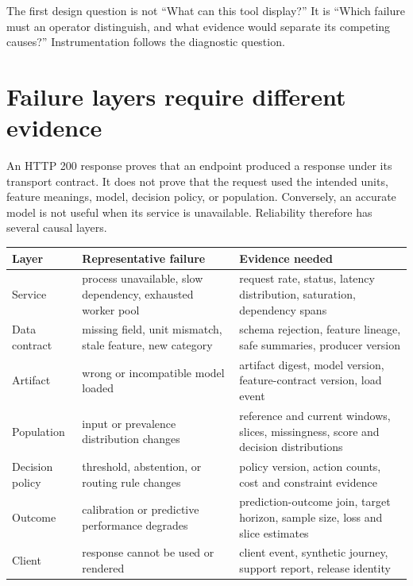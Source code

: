 The first design question is not ``What can this tool display?'' It is ``Which
failure must an operator distinguish, and what evidence would separate its
competing causes?'' Instrumentation follows the diagnostic question.

\section{Failure layers require different evidence}

An HTTP 200 response proves that an endpoint produced a response under its
transport contract. It does not prove that the request used the intended units,
feature meanings, model, decision policy, or population. Conversely, an
accurate model is not useful when its service is unavailable. Reliability
therefore has several causal layers.

\small
\begin{longtable}{@{}>{\raggedright\arraybackslash}p{}>{\raggedright\arraybackslash}p{}>{\raggedright\arraybackslash}p{}@{}}
\toprule
\textbf{Layer} & \textbf{Representative failure} & \textbf{Evidence needed} \\
\midrule
\endhead
Service & process unavailable, slow dependency, exhausted worker pool & request
rate, status, latency distribution, saturation, dependency spans \\
Data contract & missing field, unit mismatch, stale feature, new category &
schema rejection, feature lineage, safe summaries, producer version \\
Artifact & wrong or incompatible model loaded & artifact digest, model version,
feature-contract version, load event \\
Population & input or prevalence distribution changes & reference and current
windows, slices, missingness, score and decision distributions \\
Decision policy & threshold, abstention, or routing rule changes & policy
version, action counts, cost and constraint evidence \\
Outcome & calibration or predictive performance degrades & prediction-outcome
join, target horizon, sample size, loss and slice estimates \\
Client & response cannot be used or rendered & client event, synthetic journey,
support report, release identity \\
\bottomrule
\end{longtable}
\normalsize

